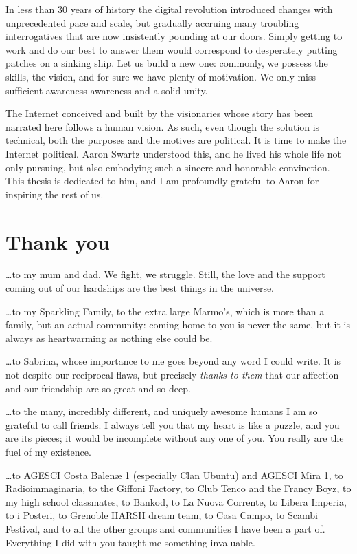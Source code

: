 \documentclass[
  a4paper,
]{book}
\begin{document}
In less than 30 years of history the digital revolution introduced changes with unprecedented pace and scale, but gradually accruing many troubling interrogatives that are now insistently pounding at our doors. Simply getting to work and do our best to answer them would correspond to desperately putting patches on a sinking ship. Let us build a new one: commonly, we possess the skills, the vision, and for sure we have plenty of motivation. We only miss sufficient awareness awareness and a solid unity.

The Internet conceived and built by the visionaries whose story has been narrated here follows a human vision. As such, even though the solution is technical, both the purposes and the motives are political. It is time to make the Internet political. Aaron Swartz understood this, and he lived his whole life not only pursuing, but also embodying such a sincere and honorable convinction. This thesis is dedicated to him, and I am profoundly grateful to Aaron for inspiring the rest of us.

\hypertarget{thank-you}{%
\chapter{Thank you}\label{thank-you}}

\ldots to my mum and dad. We fight, we struggle. Still, the love and the support coming out of our hardships are the best things in the universe.

\ldots to my Sparkling Family, to the extra large Marmo's, which is more than a family, but an actual community: coming home to you is never the same, but it is always as heartwarming as nothing else could be.

\ldots to Sabrina, whose importance to me goes beyond any word I could write. It is not despite our reciprocal flaws, but precisely \emph{thanks to them} that our affection and our friendship are so great and so deep.

\ldots to the many, incredibly different, and uniquely awesome humans I am so grateful to call friends. I always tell you that my heart is like a puzzle, and you are its pieces; it would be incomplete without any one of you. You really are the fuel of my existence.

\ldots to AGESCI Costa Balenæ 1 (especially Clan Ubuntu) and AGESCI Mira 1, to Radioimmaginaria, to the Giffoni Factory, to Club Tenco and the Francy Boyz, to my high school classmates, to Bankod, to La Nuova Corrente, to Libera Imperia, to i Posteri, to Grenoble HARSH dream team, to Casa Campo, to Scambi Festival, and to all the other groups and communities I have been a part of. Everything I did with you taught me something invaluable.
\end{document}
